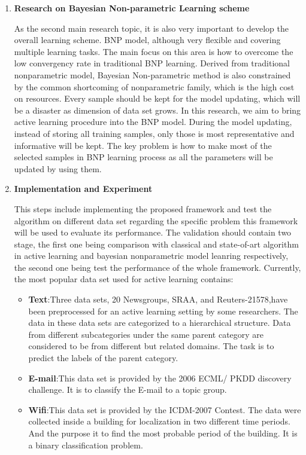 \begin{enumerate}
 \item \textbf{Research on Bayesian Non-parametric Learning scheme}
 
 As the second main research topic, it is also very important to develop the overall learning scheme. BNP model, although very flexible and covering multiple learning tasks. The main focus on this area is how to overcome the low convergency rate in traditional BNP learning. Derived from traditional nonparametric model, Bayesian Non-parametric method is also constrained by the common shortcoming of nonparametric family, which is the high cost on resources\cite{ghosh1982nonparametric,vapnik1998statistical}. Every sample should be kept for the model updating, which will be a disaster as dimension of data set grows. In this research, we aim to bring active learning procedure into the BNP model. During the model updating, instead of storing all training samples, only those is most representative and informative will be kept. The key problem is how to make most of the selected samples in BNP learning process as all the parameters will be updated by using them.  
 \item \textbf{Implementation and Experiment}
 
 This steps include implementing the proposed framework and test the algorithm on different data set regarding the specific problem this framework will be used to evaluate its performance. The validation should contain two stage, the first one being comparison with classical and state-of-art algorithm in active learning and bayesian nonparametric model leanring respectively, the second one being test the performance of the whole framework. Currently, the most popular data set used for active learning contains:
 \begin{itemize}
 \item{\textbf{Text}}:Three data sets, 20 Newsgroups, SRAA, and Reuters-21578,have been preprocessed for an active learning setting by some researchers. The data in these data sets are categorized to a hierarchical structure. Data from different subcategories under the same parent category are considered to be from different but related domains. The task is to predict the labels of the parent category.
 \item{\textbf{E-mail}}:This data set is provided by the 2006 ECML/ PKDD discovery challenge. It is to classify the E-mail to a topic group.
 \item{\textbf{Wifi}}:This data set is provided by the ICDM-2007 Contest.
 The data were collected inside a building for localization in two
different time periods. And the purpose it to find the most probable period of the building. It is a binary classification problem.
 \end{itemize}
 

\end{enumerate}
